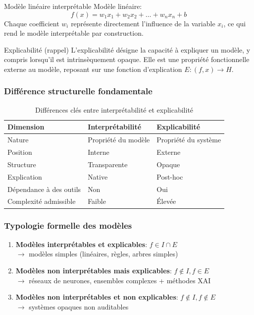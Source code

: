 \begin{exemple}{Modèle linéaire interprétable}
Modèle linéaire:
\[
f(x) = w_1 x_1 + w_2 x_2 + \dots + w_n x_n + b
\]
Chaque coefficient $w_i$ représente directement l’influence de la variable $x_i$, ce qui rend le modèle interprétable par construction.
\end{exemple}

\begin{definition}{Explicabilité (rappel)}
L’explicabilité désigne la capacité à expliquer un modèle, y compris lorsqu’il est intrinsèquement opaque. Elle est une propriété fonctionnelle externe au modèle, reposant sur une fonction d’explication $E: (f, x) \rightarrow H$.
\end{definition}

\subsubsection{Différence structurelle fondamentale}

\begin{table}[h!]
\centering
\caption{Différences clés entre interprétabilité et explicabilité}
\label{tab:interp_vs_explic}
\renewcommand{\arraystretch}{1.4}
\begin{tabularx}{\textwidth}{lXX}
\toprule
\textbf{Dimension} & \textbf{Interprétabilité} & \textbf{Explicabilité} \\
\midrule
Nature & Propriété du modèle & Propriété du système \\
Position & Interne & Externe \\
Structure & Transparente & Opaque \\
Explication & Native & Post-hoc \\
Dépendance à des outils & Non & Oui \\
Complexité admissible & Faible & Élevée \\
\hline
\end{tabularx}
\end{table}

\subsubsection{Typologie formelle des modèles}

\begin{enumerate}
    \item \textbf{Modèles interprétables et explicables}: $f \in I \cap E$ \\
    $\rightarrow$ modèles simples (linéaires, règles, arbres simples)
    
    \item \textbf{Modèles non interprétables mais explicables}: $f \notin I, f \in E$ \\
    $\rightarrow$ réseaux de neurones, ensembles complexes + méthodes XAI
    
    \item \textbf{Modèles non interprétables et non explicables}: $f \notin I, f \notin E$ \\
    $\rightarrow$ systèmes opaques non auditables
\end{enumerate}

